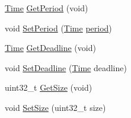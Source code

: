 \begin{DoxyCompactItemize}
\item 
\hyperlink{classns3_1_1Time}{Time} \hyperlink{classns3_1_1UlJob_a2a79e97dbc02dfddd9006c49d94ef559}{Get\+Period} (void)
\item 
void \hyperlink{classns3_1_1UlJob_a93f247ae489eaed38a2c9d475232f4a7}{Set\+Period} (\hyperlink{classns3_1_1Time}{Time} \hyperlink{mmwave_2model_2fading-traces_2fading__trace__generator_8m_ae10c944bf9f3fba2686a5885ecc192d7}{period})
\item 
\hyperlink{classns3_1_1Time}{Time} \hyperlink{classns3_1_1UlJob_a859216c455d6b1539753a1d77249b7e3}{Get\+Deadline} (void)
\item 
void \hyperlink{classns3_1_1UlJob_aee86d08df1606d5579fafe1e9990897d}{Set\+Deadline} (\hyperlink{classns3_1_1Time}{Time} deadline)
\item 
uint32\+\_\+t \hyperlink{classns3_1_1UlJob_a43f09b83841ca6f43b617cc632ec585b}{Get\+Size} (void)
\item 
void \hyperlink{classns3_1_1UlJob_a045728fb019d6bb07f740d5997f3bee3}{Set\+Size} (uint32\+\_\+t size)
\end{DoxyCompactItemize}

